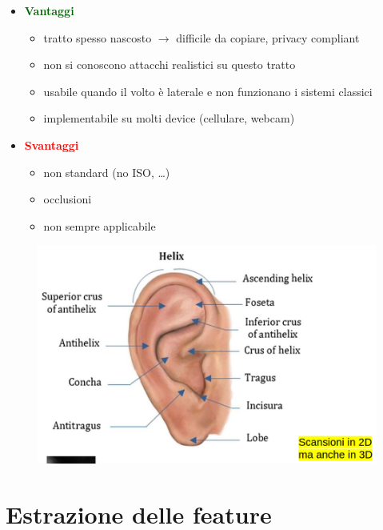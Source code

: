 \documentclass{report}
\begin{document}
\begin{itemize}
    \item \textcolor{darkgreen}{\textbf{Vantaggi}}
    \begin{itemize}
        \item tratto spesso nascosto $\rightarrow$ difficile da copiare, privacy compliant
        \item non si conoscono attacchi realistici su questo tratto 
        \item usabile quando il volto è laterale e non funzionano i sistemi classici
        \item implementabile su molti device (cellulare, webcam)
    \end{itemize}
    \item \textcolor{red}{\textbf{Svantaggi}}
    \begin{itemize}
        \item non standard (no ISO, \dots)
        \item occlusioni
        \item non sempre applicabile
    \end{itemize}
\end{itemize}

\begin{figure}[H]
    \centering
    \includegraphics[width=0.8\linewidth]{images/orecchio.png}
\end{figure}

\section{Estrazione delle feature}
\end{document}
